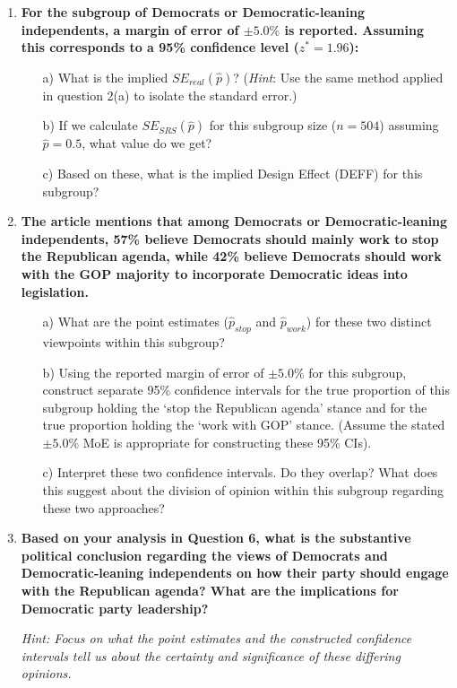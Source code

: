 \documentclass[12pt]{article}
\begin{document}
\begin{enumerate}
    \item \textbf{For the subgroup of Democrats or Democratic-leaning independents, a margin of error of $\pm 5.0\%$ is reported. Assuming this corresponds to a 95\% confidence level ($z^* = 1.96$):}
    \begin{itemize}
        \item[a)] What is the implied $SE_{real}(\hat{p})$? (\emph{Hint}: Use the same method applied in question 2(a) to isolate the standard error.)
        \item[b)] If we calculate $SE_{SRS}(\hat{p})$ for this subgroup size ($n=504$) assuming $\hat{p}=0.5$, what value do we get?
        \item[c)] Based on these, what is the implied Design Effect (DEFF) for this subgroup?
    \end{itemize}
    
    \item \textbf{The article mentions that among Democrats or Democratic-leaning independents, 57\% believe Democrats should mainly work to stop the Republican agenda, while 42\% believe Democrats should work with the GOP majority to incorporate Democratic ideas into legislation.}
    \begin{itemize}
        \item[a)] What are the point estimates ($\hat{p}_{stop}$ and $\hat{p}_{work}$) for these two distinct viewpoints within this subgroup?
        \item[b)] Using the reported margin of error of $\pm 5.0\%$ for this subgroup, construct separate 95\% confidence intervals for the true proportion of this subgroup holding the `stop the Republican agenda' stance and for the true proportion holding the `work with GOP' stance. (Assume the stated $\pm 5.0\%$ MoE is appropriate for constructing these 95\% CIs).
        \item[c)] Interpret these two confidence intervals. Do they overlap? What does this suggest about the division of opinion within this subgroup regarding these two approaches?
    \end{itemize}

    \item \textbf{Based on your analysis in Question 6, what is the substantive political conclusion regarding the views of Democrats and Democratic-leaning independents on how their party should engage with the Republican agenda? What are the implications for Democratic party leadership?}
    
    \textit{Hint: Focus on what the point estimates and the constructed confidence intervals tell us about the certainty and significance of these differing opinions.}
\end{enumerate}
\end{document}
